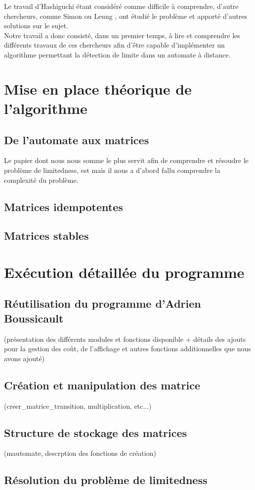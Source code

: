 \documentclass{report}
\begin{document}
Le travail d'Hashiguchi étant considéré comme difficile à comprendre, d'autre chercheurs, comme Simon \cite{Simon:Semigroups-Matrices-over-Tropical:1994:a} ou Leung \cite{Leung&Podolskiy:limitedness-problem-distance-automata::2004:a}, ont étudié le problème et apporté d'autres solutions sur le sujet.\\

Notre travail a donc consisté, dans un premier temps, à lire et comprendre les différents travaux de ces chercheurs afin d'être capable d'implémenter un algorithme permettant la détection de limite dans un automate à distance.

\part{Mise en place théorique de l'algorithme}

\chapter{De l'automate aux matrices}

Le papier dont nous nous somme le plus servit afin de comprendre et résoudre le problème de limitedness, est \cite{Simon:Semigroups-Matrices-over-Tropical:1994:a} mais il nous a d'abord fallu comprendre la complexité du problème.

\chapter{Matrices idempotentes}

\chapter{Matrices stables}

\part{Exécution détaillée du programme}

\chapter{Réutilisation du programme d'Adrien Boussicault}

(présentation des différents modules et fonctions disponible + détails des ajouts pour la gestion des coût, de l'affichage et autres fonctions additionnelles que nous avons ajouté)

\chapter{Création et manipulation des matrice}

(creer\_matrice\_transition, multiplication, etc...)

\chapter{Structure de stockage des matrices}

(mautomate, descrption des fonctions de création)

\chapter{Résolution du problème de limitedness}



\end{document}
